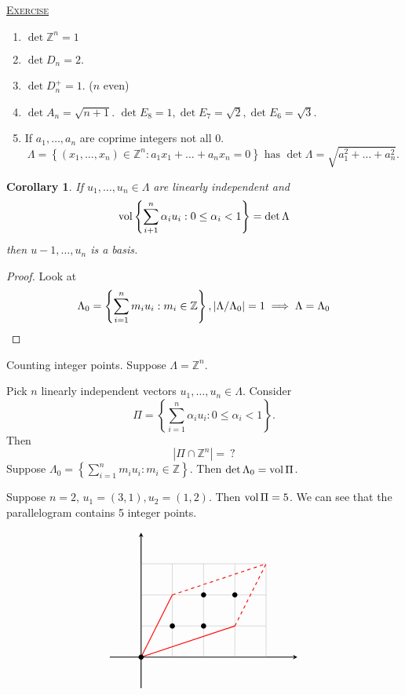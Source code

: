 \documentclass{report}
\newcommand{\Z}{\mathbb{Z}}
\newcommand{\set}[1]{\left\{ #1 \right\}}
\newcommand{\fancyem}[1]{\underline{\textsc{#1}}}
\newtheorem{corollary}{Corollary}[section]
\theoremstyle{definition}
\theoremstyle{remark}
\numberwithin{equation}{section}
\begin{document}
\fancyem{Exercise} \begin{enumerate}
    \item $\det \Z^n = 1$
    \item $\det D_n = 2$.
    \item $\det D^+_n = 1$. ($n$ even)
    \item $\det A_n = \sqrt{n+1}$. $\det E_8 = 1, \det E_7 = \sqrt{2}, \det E_6 = \sqrt{3}$.
    \item If $a_1, \ldots, a_n$ are coprime integers not all $0$. \[\Lambda = \set{(x_1, \ldots, x_n) \in \Z^n: a_1x_1 + \ldots + a_nx_n = 0} \text{ has } \det \Lambda = \sqrt{a_1^2 + \ldots + a_n^2}.\] 
\end{enumerate}

\begin{corollary}
    If $u_1, \ldots, u_n \in \Lambda$ are linearly independent and \[\vol \set{\sum_{i+1}^n \alpha_iu_i: 0 \leq \alpha_i < 1} = \det \Lambda\] then $u-1, \ldots, u_n$ is a basis.
\end{corollary}
\begin{proof}
    Look at \[\Lambda_0 = \set{\sum_{i=1}^n m_iu_i: m_i \in \Z}, |\Lambda/\Lambda_0| = 1 \implies \Lambda = \Lambda_0 \qedhere\]
\end{proof}

Counting integer points. Suppose $\Lambda = \Z^n$.

Pick $n$ linearly independent vectors $u_1, \ldots, u_n \in \Lambda$. Consider \[\Pi = \set{\sum_{i=1}^n \alpha_iu_i: 0 \leq \alpha_i < 1}.\] Then \[
    |\Pi \cap \Z^n| =\ ?    
\]
Suppose $\Lambda_0 = \set{\sum_{i=1}^n m_iu_i: m_i \in \Z}$. Then $\det \Lambda_0 = \operatorname{vol} \Pi$.

Suppose $n = 2$, $u_1 = (3, 1), u_2 = (1, 2)$. Then $\operatorname{vol} \Pi = 5$. We can see that the  parallelogram contains 5 integer points.

\[
\begin{tikzpicture}
    \draw[thick, -stealth](-1,0) -> (xyz cs:x=5);
    \draw[thick, -stealth](0,-1) -> (xyz cs:y=4);
    \draw[step=1cm,gray,very thin] (0,0) grid (4, 3);
    \draw[red, thick] (0, 0) -- (1, 2);
    \draw[red, thick] (0, 0) -- (3, 1);
    \draw[red, thick, dashed] (1, 2) -- (4, 3);
    \draw[red, thick, dashed] (3, 1) -- (4, 3);
    \node[shape=circle, fill=black, scale = 0.5] () at (0, 0) {};
    \node[shape=circle, fill=black, scale = 0.5] () at (1, 1) {};
    \node[shape=circle, fill=black, scale = 0.5] () at (2, 1) {};
    \node[shape=circle, fill=black, scale = 0.5] () at (2, 2) {};
    \node[shape=circle, fill=black, scale = 0.5] () at (3, 2) {};
\end{tikzpicture}    
\]
\end{document}
